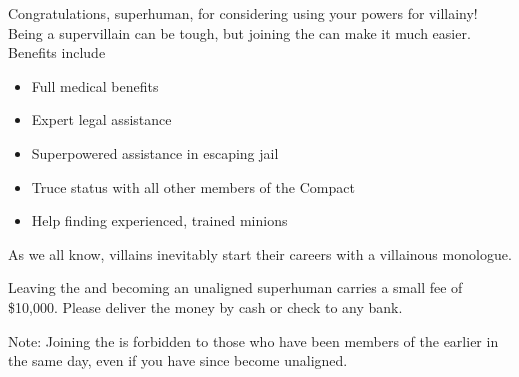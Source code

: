\documentclass[white]{guildcamp1}
\begin{document}
\name{\wVillainRecruitment{}}

Congratulations, superhuman, for considering using your powers for villainy!  Being a supervillain can be tough, but joining the \cVillainCompact{\intro} can make it much easier.  Benefits include

\begin{itemize}
\item Full medical benefits
\item Expert legal assistance
\item Superpowered assistance in escaping jail
\item Truce status with all other members of the Compact
\item Help finding experienced, trained minions
\end{itemize}

As we all know, villains inevitably start their careers with a villainous monologue.

Leaving the \cVillainCompact{\intro} and becoming an unaligned superhuman carries a small fee of \$10,000.  Please deliver the money by cash or check to any bank.  %

Note: Joining the \cVillainCompact{} is forbidden to those who have been members of the \cHeroLeague{\intro} earlier in the same day, even if you have since become unaligned.
\end{document}
